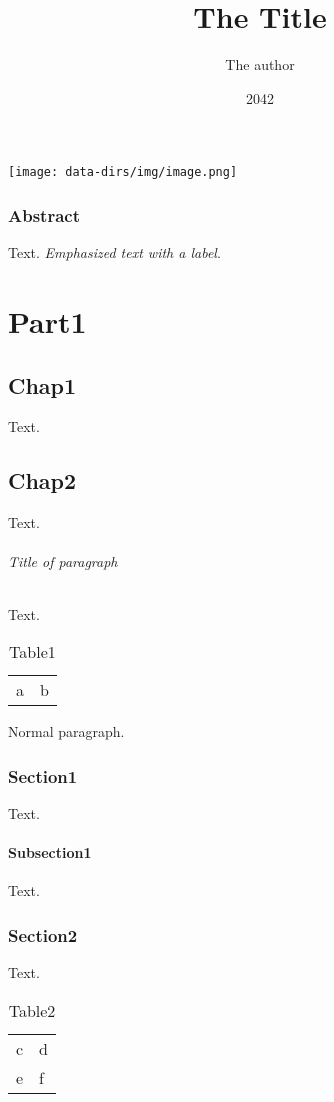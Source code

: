 \documentclass[a4paper,11pt]{book}
\title{The Title}
\author{The author}
\date{2042}
\begin{document}
\maketitle
\setcounter{tocdepth}{0}
\tableofcontents
\texttt{[image: data-dirs/img/image.png]}

\section*{Abstract}
\label{s:1}
Text.
\hypertarget{label1}{}\emph{Emphasized text with a label}.

\part{Part1}
\label{s:2}
\setcounter{tocdepth}{0}
\minitoc
\chapter{Chap1}
\label{s:3}
Text.

\chapter{Chap2}
\label{s:4}
\setcounter{tocdepth}{3}
\minitoc
Text.

\paragraph{Title of paragraph}
Text.
\begin{table}[htbp]
\begin{tabular}{ll}
a & b \\
\end{tabular}
\caption{Table1}
\label{tbl:1}
\end{table}

Normal paragraph.

\section{Section1}
\label{s:5}
Text.

\subsection{Subsection1}
\label{s:6}
Text.

\section{Section2}
\label{s:7}
Text.
\begin{table}[htbp]
\begin{tabular}{ll}
c & d \\
e & f \\
\end{tabular}
\caption{Table2}
\label{tbl:2}
\end{table}
\end{document}

